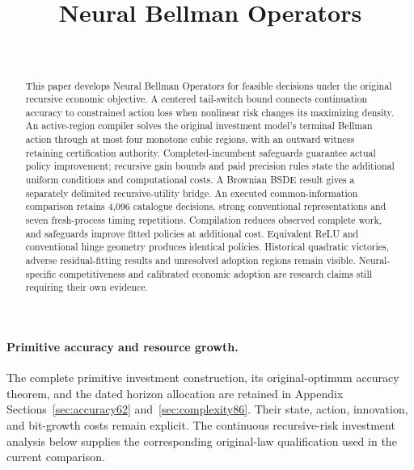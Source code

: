 \documentclass[ecta,nameyear,draft]{econsocart}
\begin{document}
\begin{frontmatter}
\title{Neural Bellman Operators}
\begin{aug}
\author[id=au1,addressref={add1}]{~}
\address[id=add1]{Peking University}
\end{aug}
\begin{abstract}
This paper develops Neural Bellman Operators for feasible decisions under the original recursive economic objective. A centered tail-switch bound connects continuation accuracy to constrained action loss when nonlinear risk changes its maximizing density. An active-region compiler solves the original investment model's terminal Bellman action through at most four monotone cubic regions, with an outward witness retaining certification authority. Completed-incumbent safeguards guarantee actual policy improvement; recursive gain bounds and paid precision rules state the additional uniform conditions and computational costs. A Brownian BSDE result gives a separately delimited recursive-utility bridge. An executed common-information comparison retains 4,096 catalogue decisions, strong conventional representations and seven fresh-process timing repetitions. Compilation reduces observed complete work, and safeguards improve fitted policies at additional cost. Equivalent ReLU and conventional hinge geometry produces identical policies. Historical quadratic victories, adverse residual-fitting results and unresolved adoption regions remain visible. Neural-specific competitiveness and calibrated economic adoption are research claims still requiring their own evidence.
\end{abstract}
\begin{keyword}
\end{keyword}
\end{frontmatter}


\paragraph{Primitive accuracy and resource growth.}
The complete primitive investment construction, its original-optimum accuracy theorem, and the dated horizon allocation are retained in Appendix Sections~\ref{sec:accuracy62} and~\ref{sec:complexity86}. Their state, action, innovation, and bit-growth costs remain explicit. The continuous recursive-risk investment analysis below supplies the corresponding original-law qualification used in the current comparison.
\end{document}
